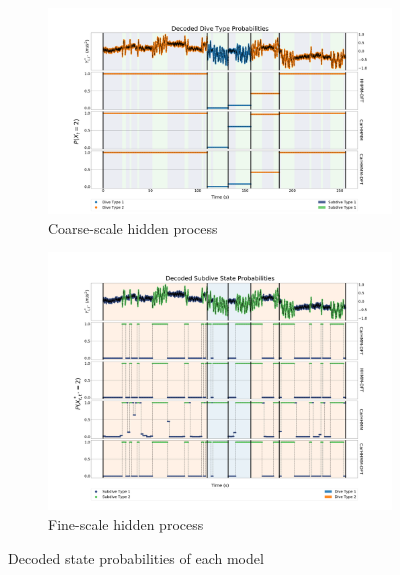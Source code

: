 \begin{figure}[ht]
    \centering
    \begin{subfigure}[t]{1.0\textwidth}
        \centering
        \includegraphics[width=5in]{Plots/Posterior_Coarse_States.png}
        \caption{Coarse-scale hidden process}
    \end{subfigure}
    \newline
    \begin{subfigure}[t]{1.0\textwidth}
        \centering
        \includegraphics[width=5in]{Plots/Posterior_Fine_States.png}
        \caption{Fine-scale hidden process}
    \end{subfigure}
	\caption{Decoded state probabilities of each model}
	\label{fig:acc}
\end{figure}

